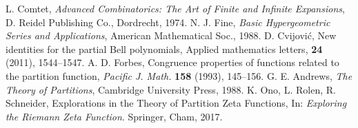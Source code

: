\documentclass{amsart}
\theoremstyle{plain}
\theoremstyle{definition}
\begin{document}
\begin{thebibliography}{99}
 L. Comtet, {\em Advanced Combinatorics: The Art of Finite and Infinite Expansions}, D. Reidel Publishing Co.,  Dordrecht, 1974.
N. J. Fine, \emph{Basic Hypergeometric Series and Applications}, American Mathematical Soc., 1988.
D. Cvijovi\'{c}, New identities for the partial Bell polynomials, Applied mathematics letters, \textbf{24} (2011), 1544--1547.
A. D. Forbes, Congruence properties of functions related to the partition function, \emph{Pacific J. Math.} \textbf{158} (1993), 145--156.
G. E. Andrews, \emph{The Theory of Partitions}, Cambridge University Press, 1988.
K. Ono, L. Rolen, R. Schneider,  Explorations in the Theory of Partition Zeta Functions, In: \emph{Exploring the Riemann Zeta Function}. Springer, Cham, 2017.
\end{thebibliography}
\end{document}
